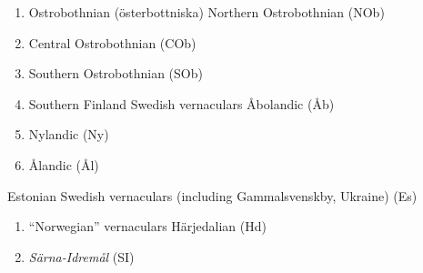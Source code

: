 \begin{enumerate} %
\item 
Ostrobothnian (österbottniska)  Northern Ostrobothnian (NOb)

\item 
Central Ostrobothnian (COb)

\item 
Southern Ostrobothnian (SOb)

\item 
Southern Finland Swedish vernaculars  Åbolandic (Åb)

\item 
Nylandic (Ny)

\item 
Ålandic (Ål)

\end{enumerate} %
Estonian Swedish vernaculars (including Gammalsvenskby, Ukraine) (Es)  


\begin{enumerate} %
\item 
“Norwegian” vernaculars  Härjedalian (Hd)

\item 
\textit{Särna-Idremål} (SI)

\end{enumerate} %
